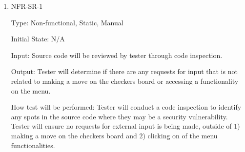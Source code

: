 \documentclass[12pt, titlepage]{article}
\begin{document}
\begin{enumerate}

\item{NFR-SR-1\\}

Type: Non-functional, Static, Manual
					
Initial State: N/A
					
Input: Source code will be reviewed by tester through code inspection.
					
Output: Tester will determine if there are any requests for input that is not related to making a move on the checkers board or accessing a functionality on the menu.
					
How test will be performed: Tester will conduct a code inspection to identify any spots in the source code where they may be a security vulnerability. Tester will ensure no requests for external input is being made, outside of 1) making a move on the checkers board and 2) clicking on of the menu functionalities.
\end{enumerate}
\end{document}
